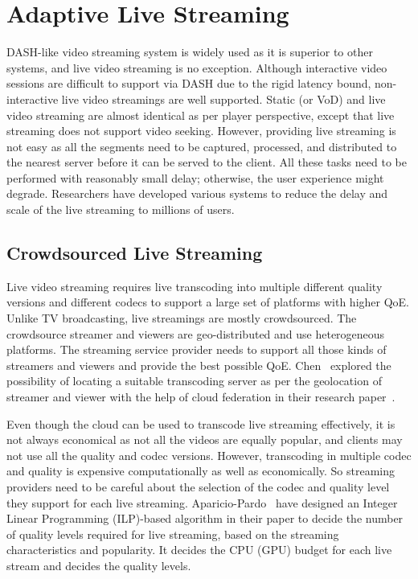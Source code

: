 \section{Adaptive Live Streaming}
\label{chapter02:live}
DASH-like video streaming system is widely used as it is superior to other systems, and live video streaming is no exception. Although interactive video sessions are difficult to support via DASH due to the rigid latency bound, non-interactive live video streamings are well supported. Static (or VoD) and live video streaming are almost identical as per player perspective, except that live streaming does not support video seeking. However, providing live streaming is not easy as all the segments need to be captured, processed, and distributed to the nearest server before it can be served to the client. All these tasks need to be performed with reasonably small delay; otherwise, the user experience might degrade. Researchers have developed various systems to reduce the delay and scale of the live streaming to millions of users.

\subsection{Crowdsourced Live Streaming}
Live video streaming requires live transcoding into multiple different quality versions and different codecs to support a large set of platforms with higher QoE. Unlike TV broadcasting, live streamings are mostly crowdsourced. The crowdsource streamer and viewers are geo-distributed and use heterogeneous platforms. The streaming service provider needs to support all those kinds of streamers and viewers and provide the best possible QoE. Chen \etal\ explored the possibility of locating a suitable transcoding server as per the geolocation of streamer and viewer with the help of cloud federation in their research paper~\cite{7218642}.

Even though the cloud can be used to transcode live streaming effectively, it is not always economical as not all the videos are equally popular, and clients may not use all the quality and codec versions. However, transcoding in multiple codec and quality is expensive computationally as well as economically. So streaming providers need to be careful about the selection of the codec and quality level they support for each live streaming. Aparicio-Pardo \etal\ have designed an Integer Linear Programming (ILP)-based algorithm in their paper \cite{10.1145/2713168.2713177} to decide the number of quality levels required for live streaming, based on the streaming characteristics and popularity. It decides the CPU (GPU) budget for each live stream and decides the quality levels. 


